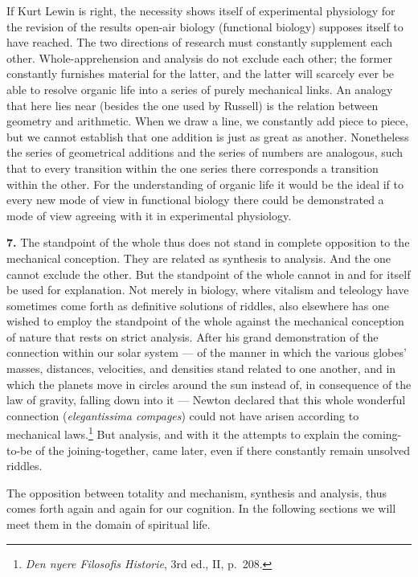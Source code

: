 \documentclass[12pt]{book}
\newcommand{\hnum}[1]{\textbf{#1.}\enspace}
\newcommand{\opage}[1]{\marginnote{\footnotesize\textit{[#1]}}}
\begin{document}
If Kurt Lewin is right, the necessity shows itself of experimental physiology for the revision of
the results open-air biology (functional biology) supposes itself to have reached. The two
directions of research must constantly supplement each other. Whole-apprehension and analysis do
not exclude each other; the former constantly furnishes material for the latter, and the latter
will scarcely ever be able to resolve organic life into a series of purely mechanical links. An
analogy that here lies near (besides the one used by Russell) is the relation between geometry and
arithmetic. When we draw a line, we constantly add piece to piece, but we cannot establish that one
addition is just as great as another. Nonetheless the series of geometrical additions and the
series of numbers are analogous, such that to every transition within the one series there
corresponds a transition within the other. For the understanding of organic life it would be the
ideal if to every new mode of view in functional biology there could be demonstrated a mode of view
agreeing with it in experimental physiology.

\hnum{7} The standpoint of the whole thus does not stand in complete \opage{27}opposition to the mechanical
conception. They are related as synthesis to analysis. And the one cannot exclude the other. But the
standpoint of the whole cannot in and for itself be used for explanation. Not merely in biology,
where vitalism and teleology have sometimes come forth as definitive solutions of riddles, also
elsewhere has one wished to employ the standpoint of the whole against the mechanical conception of
nature that rests on strict analysis. After his grand demonstration of the connection within our
solar system --- of the manner in which the various globes' masses, distances, velocities, and
densities stand related to one another, and in which the planets move in circles around the sun
instead of, in consequence of the law of gravity, falling down into it --- Newton declared that
this whole wonderful connection (\textit{elegantissima compages}) could not have arisen according to
mechanical laws.\footnote{\textit{Den nyere Filosofis Historie}, 3rd ed., II, p.\ 208.} But analysis,
and with it the attempts to explain the coming-to-be of the joining-together, came later, even if
there constantly remain unsolved riddles.

The opposition between totality and mechanism, synthesis and analysis, thus comes forth again and
again for our cognition. In the following sections we will meet them in the domain of spiritual
life.
\end{document}
